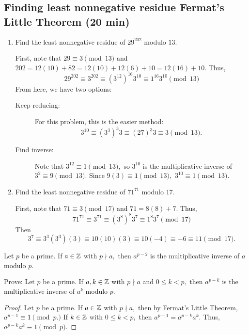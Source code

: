 \documentclass{../ximera}
\begin{document}
\subsection{Finding least nonnegative residue Fermat's Little Theorem (20 min)}
\begin{example}
\begin{enumerate}
 \item  Find the least nonnegative residue of $29^{202}$ modulo $13$. 
 
 First, note that $29\equiv 3\pmod{13}$ and $202=12(10)+82=12(10)+12(6)+10=12(16)+10.$  Thus,
 \[29^{202}\equiv3^{202}\equiv (3^{12})^{16}  3^{10}\equiv 1^{16} 3^{10}\pmod{13}\]
 From here,  we have two  options: 
\begin{description}
 \item[Keep reducing:] For this problem, this is the easier method: \[3^{10}\equiv (3^3)^3 3\equiv (27)^3 3\equiv 3\pmod{13}.\]
 \item[Find inverse:] Note that $3^{12}\equiv 1\pmod{13},$ so $3^{10}$ is the multiplicative inverse of $3^2\equiv 9\pmod{13}.$ Since $9(3)\equiv 1\pmod{13},$ $3^{10}\equiv 1\pmod{13}.$
\end{description}

\item Find the least nonnegative residue of $71^{71}$ modulo $17$. 

First, note that $71\equiv 3\pmod{17}$ and $71=8(8)+7.$  Thus,
 \[71^{71}\equiv3^{71}\equiv (3^{8})^{8}  3^{7}\equiv 1^{8} 3^{7}\pmod{17}\]
Then \[3^7\equiv 3^{3}(3^3)(3)\equiv 10(10)(3)\equiv 10(-4)\equiv -6\equiv 11\pmod{17}.\]
\end{enumerate}
\end{example}

\begin{cor*}[Corollary 2.14]\label{cor:inv-fermat}
 Let $p$ be a prime. If $a\in\mathbb Z$ with $p\nmid a,$ then $a^{p-2}$  is the multiplicative inverse of $a$ modulo $p$.
\end{cor*}

\begin{tps} Prove:
  Let $p$ be a prime. If $a,k\in\mathbb Z$ with $p\nmid a$ and $0\leq k<p,$ then $a^{p-k}$  is the multiplicative inverse of $a^k$ modulo $p$.
  
  
\begin{proof}
 Let $p$ be a prime. If $a\in\mathbb Z$ with $p\nmid a,$ then by Fermat's Little Theorem, $a^{p-1}\equiv 1\pmod{p.}$ If $k\in\mathbb Z$ with $0\leq k<p,$ then $a^{p-1}=a^{p-k}a^k.$ Thus, $a^{p-k}a^k\equiv 1\pmod{p}.$
\end{proof}
\end{tps}
\end{document}

